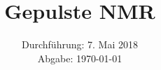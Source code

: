 

\subject{V49}
\title{Gepulste NMR}
\date{%
  Durchführung: 7. Mai 2018
  \\
  Abgabe: \today
}



\maketitle
\thispagestyle{empty}
\tableofcontents
\newpage





% 

\printbibliography{}



